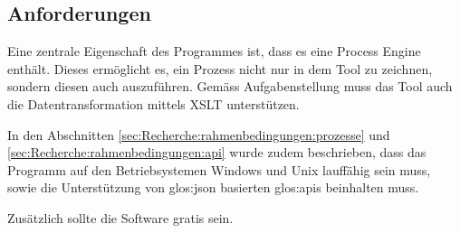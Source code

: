 \subsection{Anforderungen}
\label{sec:Recherche:programme:anforderungen}
Eine zentrale Eigenschaft des Programmes ist, dass es eine Process Engine enthält. Dieses ermöglicht es, ein Prozess nicht nur in dem Tool zu zeichnen, sondern diesen auch auszuführen. Gemäss Aufgabenstellung muss das Tool auch die Datentransformation mittels XSLT unterstützen.

In den Abschnitten \cref{sec:Recherche:rahmenbedingungen:prozesse}  und \cref{sec:Recherche:rahmenbedingungen:api}  wurde zudem beschrieben, dass das Programm auf den Betriebsystemen Windows und Unix lauffähig sein muss, sowie die Unterstützung von \Gls{glos:json} basierten \Glspl{glos:api} beinhalten muss.

Zusätzlich sollte die Software gratis sein.

